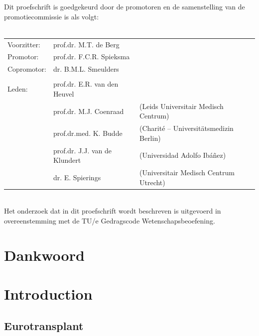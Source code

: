 \documentclass[11pt,twoside,]{book}
\begin{document}
\clearpage
\thispagestyle{empty}
\noindent
Dit proefschrift is goedgekeurd door de promotoren en de samenstelling van de
promotiecommissie is als volgt:
\\
\\
\noindent\begin{tabular}{@{}lll}


Voorzitter:
& prof.dr.
M.T.
de Berg
 & \\

Promotor:
&  prof.dr. F.C.R. Spieksma & \\

Copromotor:
&  dr. B.M.L. Smeulders & \\

\\
Leden:
&  prof.dr. E.R. van den Heuvel & \\
&  prof.dr. M.J. Coenraad & (Leids Universitair Medisch Centrum)\\
&  prof.dr.med. K. Budde & (Charité -- Universitätsmedizin Berlin)\\
&  prof.dr. J.J. van de Klundert & (Universidad Adolfo Ibáñez)\\
&  dr. E. Spierings & (Universitair Medisch Centrum Utrecht)\\
\end{tabular}\\

\vfill
\noindent
Het onderzoek dat in dit proefschrift wordt beschreven is uitgevoerd in overeenstemming met de TU/e Gedragscode Wetenschapsbeoefening.
\pagebreak



{
\setcounter{tocdepth}{1}
\tableofcontents
}
\mainmatter
\chapter*{Dankwoord}\label{dankwoord}

\chapter{Introduction}\label{CHintroduction}

\vspace*{-1em}

\section{Eurotransplant}\label{eurotransplant}
\end{document}
